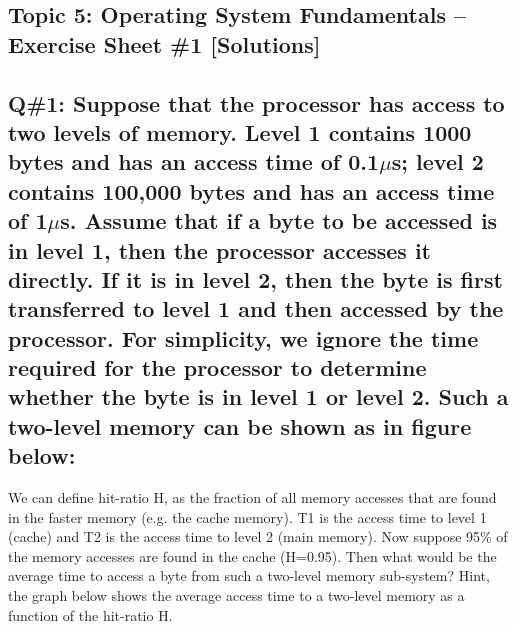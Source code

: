 \subsection{Topic 5: Operating System Fundamentals -- Exercise Sheet \#1 [Solutions]}

\subsection*{Q\#1: Suppose that the processor has access to two levels of memory. Level 1 contains 1000 bytes and has an access time of 0.1\(\mu\)s; level 2 contains 100,000 bytes and has an access time of 1\(\mu\)s. Assume that if a byte to be accessed is in level 1, then the processor accesses it directly. If it is in level 2, then the byte is first transferred to level 1 and then accessed by the processor. For simplicity, we ignore the time required for the processor to determine whether the byte is in level 1 or level 2. Such a two-level memory can be shown as in figure below:}

\usetikzlibrary{shapes, arrows.meta}
\begin{center}
\end{center}

We can define hit-ratio H, as the fraction of all memory accesses that are found in the faster memory (e.g. the cache memory). T1 is the access time to level 1 (cache) and T2 is the access time to level 2 (main memory). Now suppose 95\% of the memory accesses are found in the cache (H=0.95). Then what would be the average time to access a byte from such a two-level memory sub-system? Hint, the graph below shows the average access time to a two-level memory as a function of the hit-ratio H.

\begin{center}
\end{center}

